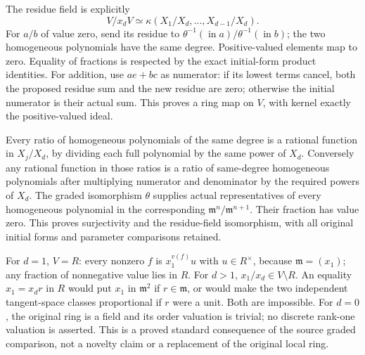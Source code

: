The residue field is explicitly \[
 V/x_dV\simeq
 \kappa(X_1/X_d,\ldots,X_{d-1}/X_d).
\] For \(a/b\) of value zero, send its residue to \(\theta^{-1}(\operatorname{in}a)/\theta^{-1}(\operatorname{in}b)\); the two homogeneous polynomials have the same degree. Positive-valued elements map to zero. Equality of fractions is respected by the exact initial-form product identities. For addition, use \(ae+bc\) as numerator: if its lowest terms cancel, both the proposed residue sum and the new residue are zero; otherwise the initial numerator is their actual sum. This proves a ring map on \(V\), with kernel exactly the positive-valued ideal.

Every ratio of homogeneous polynomials of the same degree is a rational function in \(X_j/X_d\), by dividing each full polynomial by the same power of \(X_d\). Conversely any rational function in those ratios is a ratio of same-degree homogeneous polynomials after multiplying numerator and denominator by the required powers of \(X_d\). The graded isomorphism \(\theta\) supplies actual representatives of every homogeneous polynomial in the corresponding \(\mathfrak m^n/\mathfrak m^{n+1}\). Their fraction has value zero. This proves surjectivity and the residue-field isomorphism, with all original initial forms and parameter comparisons retained.

For \(d=1\), \(V=R\): every nonzero \(f\) is \(x_1^{v(f)}u\) with \(u\in R^\times\), because \(\mathfrak m=(x_1)\); any fraction of nonnegative value lies in \(R\). For \(d>1\), \(x_1/x_d\in V\setminus R\). An equality \(x_1=x_dr\) in \(R\) would put \(x_1\) in \(\mathfrak m^2\) if \(r\in\mathfrak m\), or would make the two independent tangent-space classes proportional if \(r\) were a unit. Both are impossible. For \(d=0\), the original ring is a field and its order valuation is trivial; no discrete rank-one valuation is asserted. This is a proved standard consequence of the source graded comparison, not a novelty claim or a replacement of the original local ring.
